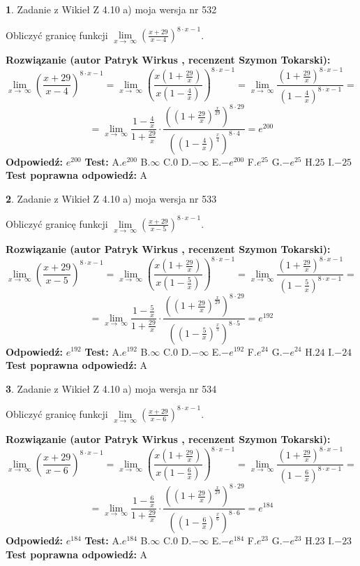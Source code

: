 \documentclass[12pt, a4paper]{article}
\theoremstyle{definition} %
\newtheorem{zad}{}
\newcommand{\zadStart}[1]{\begin{zad}#1\newline}
\newcommand{\zadStop}{\end{zad}}
\newcommand{\rozwStart}[2]{\noindent \textbf{Rozwiązanie (autor #1 , recenzent #2): }\newline}
\newcommand{\rozwStop}{\newline}
\newcommand{\odpStart}{\noindent \textbf{Odpowiedź:}\newline}
\newcommand{\odpStop}{\newline}
\newcommand{\testStart}{\noindent \textbf{Test:}\newline}
\newcommand{\testStop}{\newline}
\newcommand{\kluczStart}{\noindent \textbf{Test poprawna odpowiedź:}\newline}
\newcommand{\kluczStop}{\newline}
\begin{document}
\zadStart{Zadanie z Wikieł Z 4.10 a) moja wersja nr 532}

Obliczyć granicę funkcji  $\lim\limits_{x\to\ \infty}(\frac{x+29}{x-4})^{8\cdot x-1}$.
\zadStop
\rozwStart{Patryk Wirkus}{Szymon Tokarski}
$$\lim\limits_{x\to\ \infty}(\frac{x+29}{x-4})^{8\cdot x-1} = \lim\limits_{x\to\ \infty}(\frac{x(1+\frac{29}{x})}{x(1-\frac{4}{x})})^{8\cdot x-1}=\lim\limits_{x\to\ \infty}\frac{(1+\frac{29}{x})^{8\cdot x-1}}{(1-\frac{4}{x})^{8\cdot x-1}}=$$
$$=\lim\limits_{x\to\ \infty}\frac{1-\frac{4}{x}}{1+\frac{29}{x}}\cdot\frac{((1+\frac{29}{x})^{\frac{x}{29}})^{8\cdot29}}{((1-\frac{4}{x})^{\frac{x}{4}})^{8\cdot4}}=e^{200}$$
\rozwStop
\odpStart
$e^{200}$
\odpStop
\testStart
A.$e^{200}$ B.$\infty$ C.$0$ D.$-\infty$ E.$-e^{200}$
F.$e^{25}$ G.$-e^{25}$
H.$25$
I.$-25$
\testStop
\kluczStart
A
\kluczStop



\zadStart{Zadanie z Wikieł Z 4.10 a) moja wersja nr 533}

Obliczyć granicę funkcji  $\lim\limits_{x\to\ \infty}(\frac{x+29}{x-5})^{8\cdot x-1}$.
\zadStop
\rozwStart{Patryk Wirkus}{Szymon Tokarski}
$$\lim\limits_{x\to\ \infty}(\frac{x+29}{x-5})^{8\cdot x-1} = \lim\limits_{x\to\ \infty}(\frac{x(1+\frac{29}{x})}{x(1-\frac{5}{x})})^{8\cdot x-1}=\lim\limits_{x\to\ \infty}\frac{(1+\frac{29}{x})^{8\cdot x-1}}{(1-\frac{5}{x})^{8\cdot x-1}}=$$
$$=\lim\limits_{x\to\ \infty}\frac{1-\frac{5}{x}}{1+\frac{29}{x}}\cdot\frac{((1+\frac{29}{x})^{\frac{x}{29}})^{8\cdot29}}{((1-\frac{5}{x})^{\frac{x}{5}})^{8\cdot5}}=e^{192}$$
\rozwStop
\odpStart
$e^{192}$
\odpStop
\testStart
A.$e^{192}$ B.$\infty$ C.$0$ D.$-\infty$ E.$-e^{192}$
F.$e^{24}$ G.$-e^{24}$
H.$24$
I.$-24$
\testStop
\kluczStart
A
\kluczStop



\zadStart{Zadanie z Wikieł Z 4.10 a) moja wersja nr 534}

Obliczyć granicę funkcji  $\lim\limits_{x\to\ \infty}(\frac{x+29}{x-6})^{8\cdot x-1}$.
\zadStop
\rozwStart{Patryk Wirkus}{Szymon Tokarski}
$$\lim\limits_{x\to\ \infty}(\frac{x+29}{x-6})^{8\cdot x-1} = \lim\limits_{x\to\ \infty}(\frac{x(1+\frac{29}{x})}{x(1-\frac{6}{x})})^{8\cdot x-1}=\lim\limits_{x\to\ \infty}\frac{(1+\frac{29}{x})^{8\cdot x-1}}{(1-\frac{6}{x})^{8\cdot x-1}}=$$
$$=\lim\limits_{x\to\ \infty}\frac{1-\frac{6}{x}}{1+\frac{29}{x}}\cdot\frac{((1+\frac{29}{x})^{\frac{x}{29}})^{8\cdot29}}{((1-\frac{6}{x})^{\frac{x}{6}})^{8\cdot6}}=e^{184}$$
\rozwStop
\odpStart
$e^{184}$
\odpStop
\testStart
A.$e^{184}$ B.$\infty$ C.$0$ D.$-\infty$ E.$-e^{184}$
F.$e^{23}$ G.$-e^{23}$
H.$23$
I.$-23$
\testStop
\kluczStart
A
\kluczStop
\end{document}
